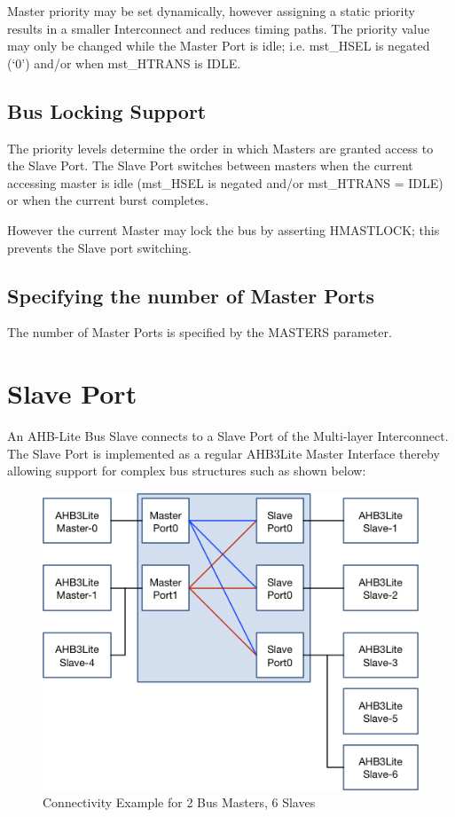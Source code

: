 Master priority may be set dynamically, however assigning a static
priority results in a smaller Interconnect and reduces timing paths. The
priority value may only be changed while the Master Port is idle; i.e.
mst\_HSEL is negated (`0') and/or when mst\_HTRANS is IDLE.

\subsection{Bus Locking Support}\label{bus-locking-support}

The priority levels determine the order in which Masters are granted
access to the Slave Port. The Slave Port switches between masters when
the current accessing master is idle (mst\_HSEL is negated and/or
mst\_HTRANS = IDLE) or when the current burst completes.

However the current Master may lock the bus by asserting HMASTLOCK; this
prevents the Slave port switching.

\subsection{Specifying the number of Master
Ports}\label{specifying-the-number-of-master-ports}

The number of Master Ports is specified by the MASTERS parameter.

\section{Slave Port}\label{slave-port}

An AHB-Lite Bus Slave connects to a Slave Port of the Multi-layer
Interconnect. The Slave Port is implemented as a regular AHB3Lite Master
Interface thereby allowing support for complex bus structures such as
shown below:

\begin{figure}[tbh]
\includegraphics{assets/img/ahb-lite-switch-sys3.png}
\caption{Connectivity Example	for 2 Bus Masters, 6 Slaves}
\label{fig:ahb-lite-switch-sys3}
\end{figure}


